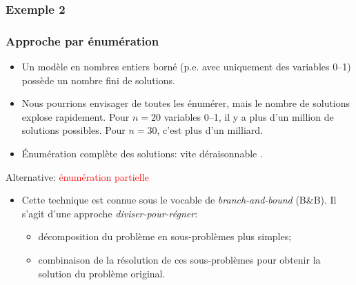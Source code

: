 \documentclass[usepdftitle=false, aspectratio=169]{beamer}
\begin{document}
\begin{frame}
\frametitle{Exemple 2}

\begin{center}
\end{center}

\end{frame}

\begin{frame}
\frametitle{Approche par énumération}

\begin{itemize}
	\item 
Un modèle en nombres entiers borné (p.e. avec uniquement des variables 0--1) possède un nombre fini de solutions.
	\item 
Nous pourrions envisager de toutes les énumérer, mais le nombre de solutions explose rapidement. Pour $n = 20$ variables 0--1, il y a plus d'un million de solutions possibles.
Pour $n=30$, c'est plus d'un milliard.
	\item 
Énumération complète des solutions: vite déraisonnable .
\end{itemize}

Alternative: \textcolor{red}{énumération partielle}
\begin{itemize}
	\item 
Cette technique est connue sous le vocable de {\sl branch-and-bound} (B\&B).
Il s'agit d'une approche {\sl diviser-pour-régner}:
\begin{itemize}
\item
décomposition du problème en sous-problèmes plus simples;
\item
combinaison de la résolution de ces sous-problèmes pour obtenir la solution du problème original.
\end{itemize}
\end{itemize}

\end{frame}
\end{document}
